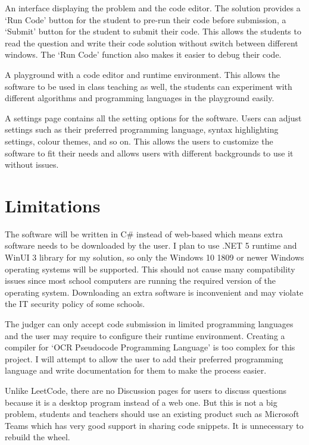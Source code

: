 \documentclass[a4paper]{report}
\begin{document}
An interface displaying the problem and the code editor. The solution provides a `Run Code' button for the student to pre-run their code before submission, a `Submit' button for the student to submit their code. This allows the students to read the question and write their code solution without switch between different windows. The `Run Code' function also makes it easier to debug their code.

A playground with a code editor and runtime environment. This allows the software to be used in class teaching as well, the students can experiment with different algorithms and programming languages in the playground easily.

A settings page contains all the setting options for the software. Users can adjust settings such as their preferred programming language, syntax highlighting settings, colour themes, and so on. This allows the users to customize the software to fit their needs and allows users with different backgrounds to use it without issues.

\section{Limitations}

The software will be written in C\# instead of web-based which means extra software needs to be downloaded by the user. I plan to use .NET 5 runtime and WinUI 3 library for my solution, so only the Windows 10 1809 or newer Windows operating systems will be supported. This should not cause many compatibility issues since most school computers are running the required version of the operating system. Downloading an extra software is inconvenient and may violate the IT security policy of some schools.

The judger can only accept code submission in limited programming languages and the user may require to configure their runtime environment. Creating a compiler for `OCR Pseudocode Programming Language' is too complex for this project. I will attempt to allow the user to add their preferred programming language and write documentation for them to make the process easier. 

Unlike LeetCode, there are no Discussion pages for users to discuss questions because it is a desktop program instead of a web one. But this is not a big problem, students and teachers should use an existing product such as Microsoft Teams which has very good support in sharing code snippets. It is unnecessary to rebuild the wheel.
\end{document}
